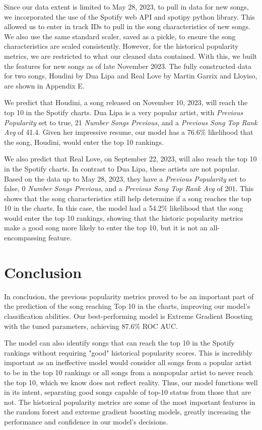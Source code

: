 \documentclass{article}
\begin{document}
Since our data extent is limited to May 28, 2023, to pull in data for new songs, we incorporated the use of the Spotify web API and spotipy python library. This allowed us to enter in track IDs to pull in the song characteristics of new songs. We also use the same standard scaler, saved as a pickle, to ensure the song characteristics are scaled consistently. However, for the historical popularity metrics, we are restricted to what our cleaned data contained. With this, we built the features for new songs as of late November 2023. The fully constructed data for two songs, Houdini by Dua Lipa and Real Love by Martin Garrix and Lloyiso, are shown in Appendix E.

We predict that Houdini, a song released on November 10, 2023, will reach the top 10 in the Spotify charts. Dua Lipa is a very popular artist, with \textit{Previous Popularity} set to true, 21 \textit{Number Songs Previous}, and a \textit{Previous Song Top Rank Avg} of 41.4. Given her impressive resume, our model has a 76.6\% likelihood that the song, Houdini, would enter the top 10 rankings.

We also predict that Real Love, on September 22, 2023, will also reach the top 10 in the Spotify charts. In contrast to Dua Lipa, these artists are not popular. Based on the data up to May 28, 2023, they have a \textit{Previous Popularity} set to false, 0 \textit{Number Songs Previous}, and a \textit{Previous Song Top Rank Avg} of 201. This shows that the song characteristics still help determine if a song reaches the top 10 in the charts. In this case, the model had a 54.2\% likelihood that the song would enter the top 10 rankings, showing that the historic popularity metrics make a good song more likely to enter the top 10, but it is not an all-encompassing feature.



\section{Conclusion}
In conclusion, the previous popularity metrics proved to be an important part of the prediction of the song reaching Top 10 in the charts, improving our model's classification abilities. Our best-performing model is Extreme Gradient Boosting with the tuned parameters, achieving 87.6\% ROC AUC. 

The model can also identify songs that can reach the top 10 in the Spotify rankings without requiring "good" historical popularity scores. This is incredibly important as an ineffective model would consider all songs from a popular artist to be in the top 10 rankings or all songs from a nonpopular artist to never reach the top 10, which we know does not reflect reality. Thus, our model functions well in its intent, separating good songs capable of top-10 status from those that are not. The historical popularity metrics are some of the most important features in the random forest and extreme gradient boosting models, greatly increasing the performance and confidence in our model's decisions.
\end{document}
